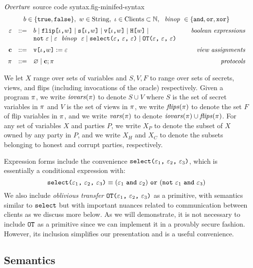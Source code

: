 \begin{fpfig}[t]{$\mathit{Overture}$ source code syntax.}{fig-minifed-syntax}
  {\small
    $$
    \begin{array}{rcl@{\hspace{8mm}}r}
      \multicolumn{4}{c}{b \in \{ \etrue, \efalse \},\  w \in \mathrm{String},\ \cid \in \mathrm{Clients} \subset  \mathbb{N},\ \bop \in \{ \eand, \eor, \exor \}} \\[2mm]
      \be &::=& b \mid \flip{\cid}{w} \mid \secret{\cid}{w} \mid \view{\cid}{w} \mid \oracle{w} \mid & \textit{boolean expressions}\\
      & &  \enot\ \be \mid \be\ \bop\ \be \mid \select{\be}{\be}{\be} \mid \OT{\be}{\be}{\be} \\[2mm]
      \instr &::=& \eassign{\view{\cid}{w}}{\be} & \textit{view assignments} \\[2mm]
      \prog &::=& \varnothing \mid \instr; \prog & \textit{protocols}
    \end{array}
    $$
  }
\end{fpfig}

We let $X$ range over sets of variables and $S,V,F$ to range over sets
of secrets, views, and flips (including invocations of the oracle)
respectively. Given a program $\pi$, we write $\mathit{iovars}(\pi)$ to
denote $S \cup V$ where $S$ is the set of secret variables in $\pi$
and $V$ is the set of views in $\pi$, we write $\mathit{flips}(\pi)$
to denote the set $F$ of flip variables in $\pi$, and we
write $\mathit{vars}(\pi)$ to denote $\mathit{iovars}(\pi) \cup \mathit{flips}(\pi)$. For any set of
variables $X$ and parties $P$, we write $X_P$ to denote the subset of
$X$ owned by any party in $P$, and we write $X_H$ and $X_C$ to denote
the subsets belonging to honest and corrupt parties, respectively.

Expression forms include the convenience
$\texttt{select(} \varepsilon_1 \texttt{,}\ \varepsilon_2 \texttt{,}\ \varepsilon_3 \texttt{)}$, which is essentially a conditional
expression with:
$$
\select{\be_1}{\be_2}{\be_3} \equiv (\be_1\ \eand\ \be_2)\ \eor\ (\enot\ \be_1\ \eand\ \be_3)
$$
We also include \emph{oblivious transfer} $\texttt{OT(} \varepsilon_1 \texttt{,}\ \varepsilon_2 \texttt{,}\ \varepsilon_3 \texttt{)}$ as a primitive,
with semantics similar to $\texttt{select}$ but with important nuances
related to communication between clients as we discuss more below.
As we will demonstrate, it is not necessary to include $\texttt{OT}$
as a primitive since we can implement it in a provably secure
fashion. However, its inclusion simplifies our presentation and is a useful
convenience.

\subsection{Semantics}

